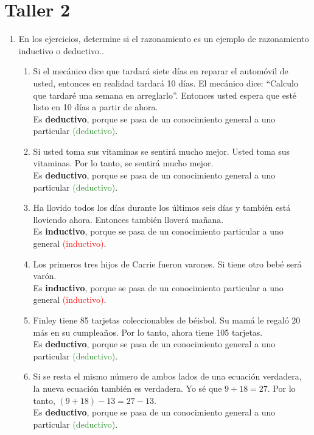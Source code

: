 \documentclass[12pt,letterpaper]{exam}
\begin{document}
\section*{Taller 2}


\begin{enumerate}
  \item En los ejercicios, determine si el razonamiento es un ejemplo de razonamiento inductivo o deductivo..
  \begin{enumerate}[label=\alph*)]
  \item Si el mecánico dice que tardará siete días en reparar el automóvil de usted, entonces en realidad tardará 10 días. El mecánico dice: ``Calculo que tardaré una semana en arreglarlo''. Entonces usted espera que esté listo en 10 días a partir de ahora. 
  \\ Es \textbf{deductivo}, porque se pasa de un conocimiento general a uno particular \textcolor{ForestGreen}{(deductivo)}.

  \item Si usted toma sus vitaminas se sentirá mucho mejor. Usted toma sus vitaminas. Por lo tanto, se sentirá mucho mejor. 
  \\ Es \textbf{deductivo}, porque se pasa de un conocimiento general a uno particular \textcolor{ForestGreen}{(deductivo)}.

  \item Ha llovido todos los días durante los últimos seis días y también está lloviendo ahora. Entonces también lloverá mañana. 
  \\ Es \textbf{inductivo}, porque se pasa de un conocimiento particular a uno general \textcolor{red}{(inductivo)}.

  \item Los primeros tres hijos de Carrie fueron varones. Si tiene otro bebé será varón. 
  \\ Es \textbf{inductivo}, porque se pasa de un conocimiento particular a uno general \textcolor{red}{(inductivo)}.

  \item Finley tiene 85 tarjetas coleccionables de béisbol. Su mamá le regaló 20 más en su cumpleaños. Por lo tanto, ahora tiene 105 tarjetas. 
  \\ Es \textbf{deductivo}, porque se pasa de un conocimiento general a uno particular \textcolor{ForestGreen}{(deductivo)}.

  \item Si se resta el mismo número de ambos lados de una ecuación verdadera, la nueva ecuación también es verdadera. Yo sé que $9+18=27$. Por lo tanto, $(9+18)-13=27-13$. 
  \\ Es \textbf{deductivo}, porque se pasa de un conocimiento general a uno particular \textcolor{ForestGreen}{(deductivo)}.


\end{enumerate}
\end{enumerate}
\end{document}
